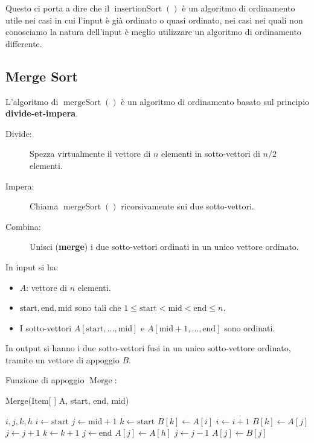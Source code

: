        Questo ci porta a dire che il $ \operatorname{insertionSort}() $ è un algoritmo di ordinamento utile nei casi in cui l'input è già ordinato o quasi ordinato, nei casi nei quali non conosciamo la natura dell'input è meglio utilizzare un algoritmo di ordinamento differente.
    \subsection{Merge Sort}
        L'algoritmo di $ \operatorname{mergeSort}() $ è un algoritmo di ordinamento basato sul principio \textbf{divide-et-impera}.
        \begin{description}
            \item[Divide:] Spezza virtualmente il vettore di $ n $ elementi in sotto-vettori di $ n/2 $ elementi.
            \item[Impera:] Chiama $ \operatorname{mergeSort}() $ ricorsivamente sui due sotto-vettori.
            \item[Combina:] Unisci (\textbf{merge}) i due sotto-vettori ordinati in un unico vettore ordinato. 
        \end{description}
        In input si ha:
        \begin{itemize}
            \item $ A $: vettore di $ n $ elementi.
            \item $ \text{start}, \text{end}, \text{mid} $ sono tali che $ 1\leq \text{start} < \text{mid} < \text{end} \leq n $.
            \item I sotto-vettori $ A[\text{start},\ldots,\text{mid}] $ e $ A[\text{mid}+1,\ldots,\text{end}] $ sono ordinati.
        \end{itemize}
        In output si hanno i due sotto-vettori fusi in un unico sotto-vettore ordinato, tramite un vettore di appoggio $ B $.

        Funzione di appoggio $\operatorname{Merge}$:
        \begin{algorithm}
            \caption{Merge(Item[ ] A, \Int start, \Int end, \Int mid)}\label{alg:merge}
            \begin{algorithmic}[1]
                \State \Int $i,j,k,h$
                \State \Int $i \gets \text{start}$
                \State \Int $j \gets \text{mid}+1$
                \State \Int $k \gets \text{start}$
                        \State $B[k] \gets A[i]$
                        \State $i \gets i+1$
                    \Else
                        \State $B[k] \gets A[j]$
                        \State $j \gets j+1$
                    \EndIf
                    \State $k \gets k+1$
                \EndWhile
                \State $j \gets \text{end}$
                    \State $A[j] \gets A[h]$
                    \State $j \gets j-1$
                \EndFor
                    \State $A[j] \gets B[j]$
                \EndFor
            \end{algorithmic}
        \end{algorithm}
        
